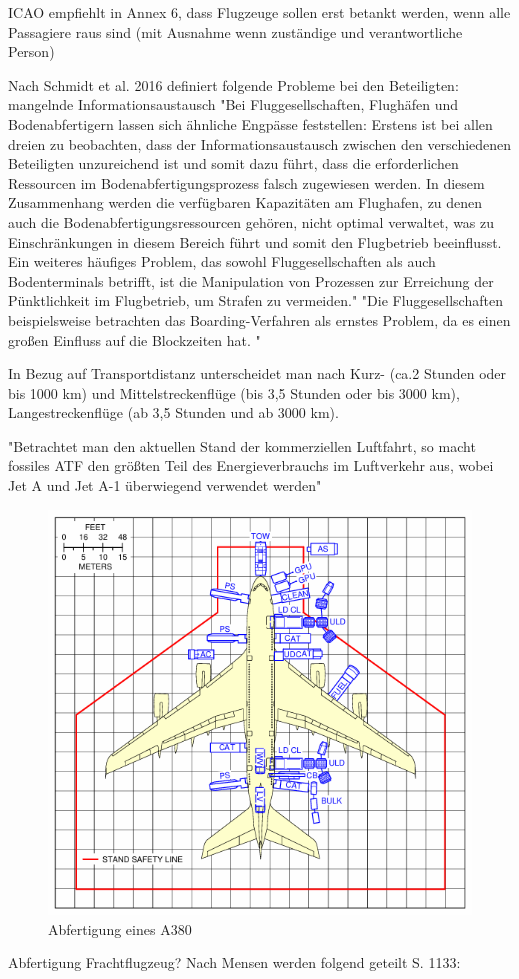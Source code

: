 ICAO empfiehlt in Annex 6, dass Flugzeuge sollen erst betankt werden, wenn alle Passagiere raus sind 
(mit Ausnahme wenn zuständige und verantwortliche Person) 






Nach Schmidt et al. 2016 definiert folgende Probleme bei den Beteiligten: mangelnde Informationsaustausch
 "Bei Fluggesellschaften, Flughäfen und Bodenabfertigern lassen sich ähnliche Engpässe feststellen: 
 Erstens ist bei allen dreien zu beobachten, dass der Informationsaustausch zwischen den verschiedenen Beteiligten 
 unzureichend ist und somit dazu führt, dass die erforderlichen Ressourcen im Bodenabfertigungsprozess falsch zugewiesen werden. 
 In diesem Zusammenhang werden die verfügbaren Kapazitäten am Flughafen, zu denen auch die Bodenabfertigungsressourcen gehören, 
 nicht optimal verwaltet, was zu Einschränkungen in diesem Bereich führt und somit den Flugbetrieb beeinflusst. 
 Ein weiteres häufiges Problem, das sowohl Fluggesellschaften als auch Bodenterminals betrifft, ist die Manipulation
  von Prozessen zur Erreichung der Pünktlichkeit im Flugbetrieb, um Strafen zu vermeiden."
  "Die Fluggesellschaften beispielsweise betrachten das Boarding-Verfahren als ernstes Problem, 
  da es einen großen Einfluss auf die Blockzeiten hat. "

In Bezug auf Transportdistanz unterscheidet man nach Kurz- (ca.2 Stunden oder bis 1000 km) 
und Mittelstreckenflüge (bis 3,5 Stunden oder bis 3000 km), Langestreckenflüge (ab 3,5 Stunden und ab 3000 km). \cite{mensen2013handbuch}

"Betrachtet man den aktuellen Stand der kommerziellen Luftfahrt, so macht fossiles ATF den 
größten Teil des Energieverbrauchs im Luftverkehr aus, wobei Jet A und Jet A-1 überwiegend verwendet werden"

\begin{figure}[h]
	\centering
	\includegraphics[width=0.8\linewidth]{Bilder/A380.png}
	\caption[Abfertigung A380]{Abfertigung eines A380 \cite{AirbusA380Characteristics}}
	\label{abfertigung}
\end{figure}

Abfertigung Frachtflugzeug?
Nach Mensen werden folgend geteilt S. 1133:
